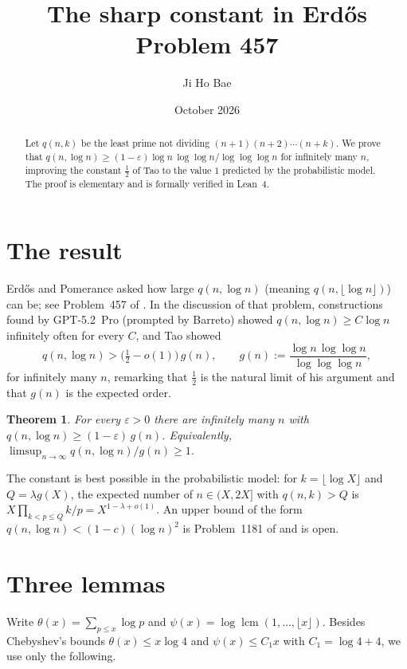 \documentclass[11pt]{article}
\title{The sharp constant in Erd\H{o}s Problem 457}
\author{Ji Ho Bae}
\date{October 2026}
\newtheorem{theorem}{Theorem}
\theoremstyle{remark}
\DeclareMathOperator{\lcm}{lcm}
\begin{document}
\maketitle

\begin{abstract}
Let \(q(n,k)\) be the least prime not dividing \((n+1)(n+2)\cdots(n+k)\).  We prove that
\(q(n,\log n)\ge(1-\varepsilon)\log n\,\log\log n/\log\log\log n\) for infinitely many \(n\),
improving the constant \(\tfrac12\) of Tao to the value \(1\) predicted by the probabilistic
model.  The proof is elementary and is formally verified in Lean~4.
\end{abstract}

\section{The result}

Erd\H{o}s and Pomerance \cite{Erdos1979} asked how large
\(q(n,\log n)\) (meaning \(q(n,\lfloor\log n\rfloor)\)) can be; see Problem~457 of
\cite{Bloom457}.  In the discussion of that problem, constructions found by GPT-5.2~Pro
(prompted by Barreto) showed \(q(n,\log n)\ge C\log n\) infinitely often for every \(C\), and
Tao showed
\[
q(n,\log n)>\bigl(\tfrac12-o(1)\bigr)\,g(n),\qquad
g(n):=\frac{\log n\,\log\log n}{\log\log\log n},
\]
for infinitely many \(n\), remarking that \(\tfrac12\) is the natural limit of his argument and
that \(g(n)\) is the expected order.

\begin{theorem}\label{thm}
For every \(\varepsilon>0\) there are infinitely many \(n\) with
\(q(n,\log n)\ge(1-\varepsilon)\,g(n)\).  Equivalently,
\(\limsup_{n\to\infty}q(n,\log n)/g(n)\ge1\).
\end{theorem}

The constant is best possible in the probabilistic model: for \(k=\lfloor\log X\rfloor\) and
\(Q=\lambda g(X)\), the expected number of \(n\in(X,2X]\) with \(q(n,k)>Q\) is
\(X\prod_{k<p\le Q}k/p=X^{1-\lambda+o(1)}\).  An upper bound of the form
\(q(n,\log n)<(1-c)(\log n)^2\) is Problem~1181 of \cite{Bloom457} and is open.

\section{Three lemmas}

Write \(\theta(x)=\sum_{p\le x}\log p\) and \(\psi(x)=\log\lcm(1,\dots,\lfloor x\rfloor)\).
Besides Chebyshev's bounds \(\theta(x)\le x\log4\) and \(\psi(x)\le C_1x\) with
\(C_1=\log4+4\), we use only the following.
\end{document}
